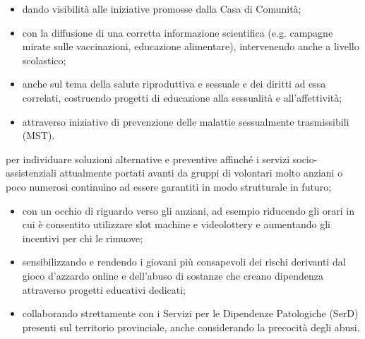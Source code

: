 \begin{itemize}
  \item dando visibilità alle iniziative promosse dalla Casa di Comunità;
  \item con la diffusione di una corretta informazione scientifica (e.g. campagne mirate sulle vaccinazioni, educazione alimentare), intervenendo anche a livello scolastico; 
  \item anche sul tema della salute riproduttiva e sessuale e dei diritti ad essa correlati, costruendo  progetti di educazione alla sessualità e all'affettività;
  \item attraverso iniziative di prevenzione delle malattie sessualmente trasmissibili (MST).
\end{itemize}

 per individuare soluzioni alternative e preventive affinché i servizi socio-assistenziali attualmente portati avanti da gruppi di volontari molto anziani o poco numerosi continuino ad essere garantiti in modo strutturale in futuro;

\begin{bluebox}
\begin{itemize}
  \item con un occhio di riguardo verso gli anziani, ad esempio riducendo gli orari in cui è consentito utilizzare slot machine e videolottery e aumentando gli incentivi per chi le rimuove;
  \item sensibilizzando e rendendo i giovani più consapevoli dei rischi derivanti dal gioco d'azzardo online e dell'abuso di sostanze che creano dipendenza attraverso progetti educativi dedicati;
  \item collaborando strettamente con i Servizi per le Dipendenze Patologiche (SerD) presenti sul territorio provinciale, anche considerando la precocità degli abusi. 
\end{itemize}
\end{bluebox}
